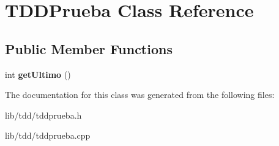 \section{T\+D\+D\+Prueba Class Reference}
\label{class_t_d_d_prueba}
\subsection*{Public Member Functions}
\begin{DoxyCompactItemize}
\item 
int {\bfseries get\+Ultimo} ()\label{class_t_d_d_prueba_aaa2c3c0342544285627f6b70468f8407}

\end{DoxyCompactItemize}


The documentation for this class was generated from the following files\+:\begin{DoxyCompactItemize}
\item 
lib/tdd/tddprueba.\+h\item 
lib/tdd/tddprueba.\+cpp\end{DoxyCompactItemize}
